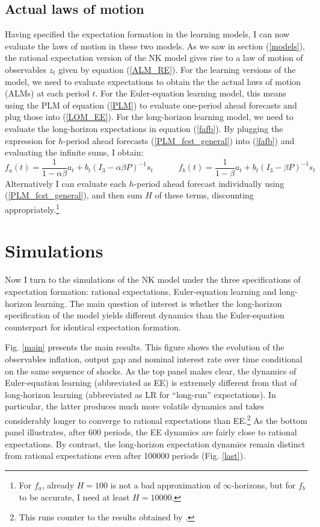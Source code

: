 \documentclass[11pt]{article}
\renewcommand{\[}{\begin{equation}}
\renewcommand{\]}{\end{equation}}
\begin{document}
\subsection{Actual laws of motion}\label{ALMs}
Having specified the expectation formation in the learning models, I can now evaluate the laws of motion in these two models. As we saw in section (\ref{models}), the rational expectation version of the NK model gives rise to a law of motion of observables $z_t$ given by equation (\ref{ALM_RE}). For the learning versions of the model, we need to evaluate expectations to obtain the the actual laws of motion (ALMs) at each period $t$. For the Euler-equation learning model, this means using the PLM of equation (\ref{PLM}) to evaluate one-period ahead forecasts and plug those into (\ref{LOM_EE}). For the long-horizon learning model, we need to evaluate the long-horizon expectations in equation (\ref{fafb}). By plugging the expression for $h$-period ahead forecasts (\ref{PLM_fcst_general}) into (\ref{fafb}) and evaluating the infinite sums, I obtain:
\begin{equation}
f_a(t) = \frac{1}{1-\alpha\beta}a_{t}  + b_{t}(I_3 - \alpha\beta P)^{-1}s_t \quad \quad \quad f_b(t) = \frac{1}{1-\beta}a_{t}  + b_{t}(I_3 - \beta P)^{-1}s_t  \label{fafb_analytical_general}
\end{equation}
Alternatively I can evaluate each $h$-period ahead forecast individually using (\ref{PLM_fcst_general}), and then sum $H$ of these terms, discounting appropriately.\footnote{For $f_a$, already $H=100$ is not a bad approximation of $\infty$-horizons, but for $f_b$ to be accurate, I need at least $H=10000$.}

\section{Simulations}	\label{simulations}
Now I turn to the simulations of the NK model under the three specifications of expectation formation: rational expectations, Euler-equation learning and long-horizon learning. The main question of interest is whether the long-horizon specification of the model yields different dynamics than the Euler-equation counterpart for identical expectation formation. 

Fig. \ref{main} presents the main results. This figure shows the evolution of the observables inflation, output gap and nominal interest rate over time conditional on the same sequence of shocks. As the top panel makes clear, the dynamics of Euler-equation learning (abbreviated as EE) is extremely different from that of long-horizon learning (abbreviated as LR for ``long-run'' expectations). In particular, the latter produces much more volatile dynamics and takes considerably longer to converge to rational expectations than EE.\footnote{This runs counter to the results obtained by \cite{graham2011individual}.} As the bottom panel illustrates, after 600 periods, the EE dynamics are fairly close to rational expectations. By contrast, the long-horizon expectation dynamics remain distinct from rational expectations even after 100000 periods (Fig. \ref{last}).
\end{document}
